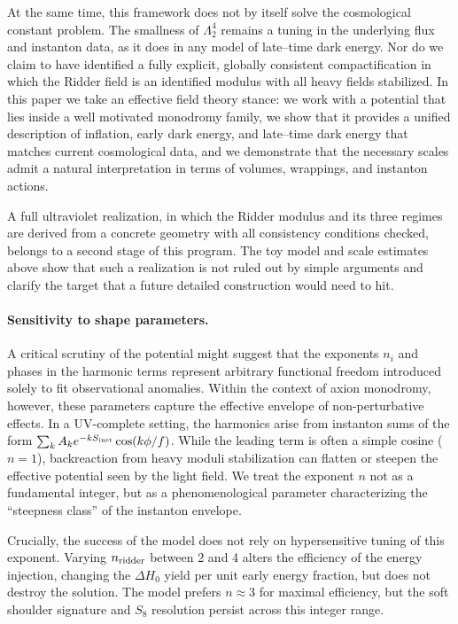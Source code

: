 \documentclass[a4paper,11pt]{article}
\begin{document}
At the same time, this framework does not by itself solve the cosmological constant problem. The smallness of $\Lambda_2^4$ remains a tuning in the underlying flux and instanton data, as it does in any model of late–time dark energy. Nor do we claim to have identified a fully explicit, globally consistent compactification in which the Ridder field is an identified modulus with all heavy fields stabilized. In this paper we take an effective field theory stance: we work with a potential that lies inside a well motivated monodromy family, we show that it provides a unified description of inflation, early dark energy, and late–time dark energy that matches current cosmological data, and we demonstrate that the necessary scales admit a natural interpretation in terms of volumes, wrappings, and instanton actions.

A full ultraviolet realization, in which the Ridder modulus and its three regimes are derived from a concrete geometry with all consistency conditions checked, belongs to a second stage of this program. The toy model and scale estimates above show that such a realization is not ruled out by simple arguments and clarify the target that a future detailed construction would need to hit.

\paragraph{Sensitivity to shape parameters.}
A critical scrutiny of the potential might suggest that the exponents $n_i$ and phases in the harmonic terms represent arbitrary functional freedom introduced solely to fit observational anomalies. Within the context of axion monodromy, however, these parameters capture the effective envelope of non-perturbative effects. In a UV-complete setting, the harmonics arise from instanton sums of the form $\sum_k A_k e^{-k S_{\rm inst}} \cos(k\phi/f)$. While the leading term is often a simple cosine ($n=1$), backreaction from heavy moduli stabilization can flatten or steepen the effective potential seen by the light field. We treat the exponent $n$ not as a fundamental integer, but as a phenomenological parameter characterizing the ``steepness class'' of the instanton envelope.

Crucially, the success of the model does not rely on hypersensitive tuning of this exponent. Varying $n_{\rm ridder}$ between 2 and 4 alters the efficiency of the energy injection, changing the $\Delta H_0$ yield per unit early energy fraction, but does not destroy the solution. The model prefers $n \approx 3$ for maximal efficiency, but the soft shoulder signature and $S_8$ resolution persist across this integer range.
\end{document}
